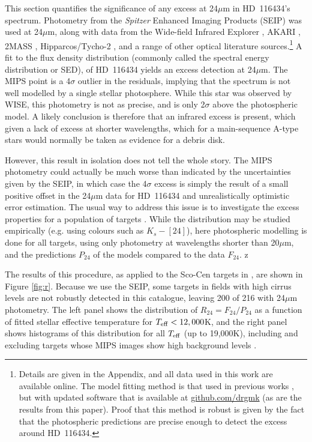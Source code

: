 \documentclass[a4paper,fleqn,usenatbib]{mnras}
\begin{document}
This section quantifies the significance of any excess at 24$\mu$m in
HD~116434's spectrum. Photometry from the \emph{Spitzer} Enhanced
Imaging Products (SEIP) was used at 24$\mu$m, along with data from the
Wide-field Infrared Explorer \citep[WISE,][]{2010AJ....140.1868W}, AKARI
\citep{2010A&A...514A...1I}, 2MASS \citep{2006AJ....131.1163S},
Hipparcos/Tycho-2 \citep{1997ESASP1200.....P}, and a range of other
optical literature sources.\footnote{Details are given in the Appendix,
  and all data used in this work are available online. The model fitting
  method is that used in previous works
  \citep[e.g.][]{2014MNRAS.445.2558T,2012MNRAS.426...91K,2014MNRAS.444.3164K,2017RSOS....460652K},
  but with updated software that is available at
  \href{https://github.com/drgmk}{github.com/drgmk} (as are the results
  from this paper). Proof that this method is robust is given by the
  fact that the photospheric predictions are precise enough to detect
  the excess around HD~116434.}  A fit to the flux density distribution
(commonly called the spectral energy distribution or SED), of HD~116434
yields an excess detection at 24$\mu$m. The MIPS point is a 4$\sigma$
outlier in the residuals, implying that the spectrum is not well
modelled by a single stellar photosphere. While this star was observed
by WISE, this photometry is not as precise, and is only 2$\sigma$ above
the photospheric model. A likely conclusion is therefore that an
infrared excess is present, which given a lack of excess at shorter
wavelengths, which for a main-sequence A-type stars would normally be
taken as evidence for a debris disk.

However, this result in isolation does not tell the whole story. The
MIPS photometry could actually be much worse than indicated by the
uncertainties given by the SEIP, in which case the 4$\sigma$ excess is
simply the result of a small positive offset in the 24$\mu$m data for
HD~116434 and unrealistically optimistic error estimation. The usual way
to address this issue is to investigate the excess properties for a
population of targets \citep[e.g.][]{2006ApJ...653..675S}. While the
distribution may be studied empirically (e.g. using colours such as
$K_s - [24]$), here photospheric modelling is done for all targets,
using only photometry at wavelengths shorter than 20$\mu$m, and the
predictions $P_{24}$ of the models compared to the data $F_{24}$. z

The results of this procedure, as applied to the Sco-Cen targets in
\citet{2012ApJ...756..133C}, are shown in Figure \ref{fig:r}. Because we
use the SEIP, some targets in fields with high cirrus levels are not
robustly detected in this catalogue, leaving 200 of 216 with 24$\mu$m
photometry. The left panel shows the distribution of
$R_{24}=F_{24}/P_{24}$ as a function of fitted stellar effective
temperature for $T_{\rm eff}<12,000$K, and the right panel shows
histograms of this distribution for all $T_{\rm eff}$ (up to 19,000K),
including and excluding targets whose MIPS images show high background
levels \citep[as flagged by][noting that HD~116434 itself was not
flagged]{2012ApJ...756..133C}.
\end{document}
